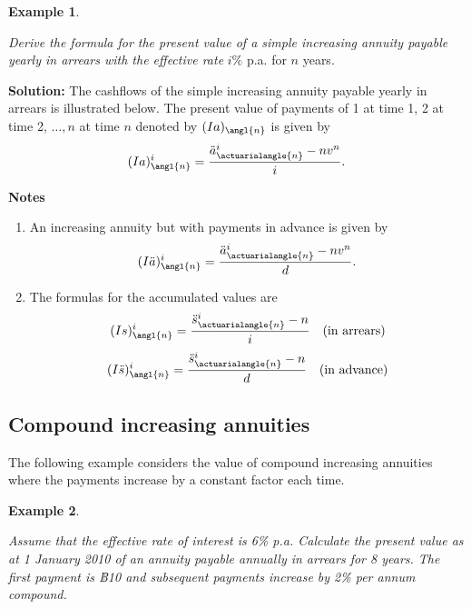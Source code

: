 \documentclass[
]{book}
\theoremstyle{definition}
\theoremstyle{definition}
\newtheorem{example}{Example}[chapter]
\theoremstyle{definition}
\theoremstyle{definition}
\theoremstyle{remark}
\begin{document}
\begin{example}
\protect\hypertarget{exm:unlabeled-div-35}{}\label{exm:unlabeled-div-35}

\emph{Derive the formula for the present value of a simple increasing annuity
payable yearly in arrears with the effective rate} \(i\%\) p.a. for \(n\)
years.

\end{example}

\textbf{Solution:} The cashflows of the simple increasing annuity payable
yearly in arrears is illustrated below. The present value of payments of
1 at time 1, 2 at time 2, \(\ldots, n\) at time \(n\) denoted by
\((Ia)_\angl{n}\) is given by
\[(Ia)^{i}_\angl{n}   = \frac{\ddot{a}^{i}_{\actuarialangle{n}} - nv^n}{i}.\]

\textbf{Notes}

\begin{enumerate}
\def\labelenumi{\arabic{enumi}.}
\item
  An increasing annuity but with payments in advance is given by
  \[(I\ddot{a})^{i}_\angl{n}   = \frac{\ddot{a}^{i}_{\actuarialangle{n}} - nv^n}{d}.\]
\item
  The formulas for the accumulated values are
  \[(Is)^{i}_\angl{n} = \frac{\ddot{s}^{i}_{\actuarialangle{n}} - n}{i} \quad\text{(in arrears)}\]
  \[(I\ddot{s})^{i}_\angl{n} = \frac{\ddot{s}^{i}_{\actuarialangle{n}} - n}{d} \quad\text{(in advance)}\]
\end{enumerate}

\hypertarget{compound-increasing-annuities}{%
\subsection{Compound increasing annuities}\label{compound-increasing-annuities}}

The following example considers the value of compound increasing
annuities where the payments increase by a constant factor each time.

\begin{example}
\protect\hypertarget{exm:unlabeled-div-36}{}\label{exm:unlabeled-div-36}

\emph{Assume that the effective rate of interest is 6\% p.a. Calculate the
present value as at 1 January 2010 of an annuity payable annually in
arrears for 8 years. The first payment is ฿10 and subsequent payments
increase by 2\% per annum compound.}

\end{example}
\end{document}
